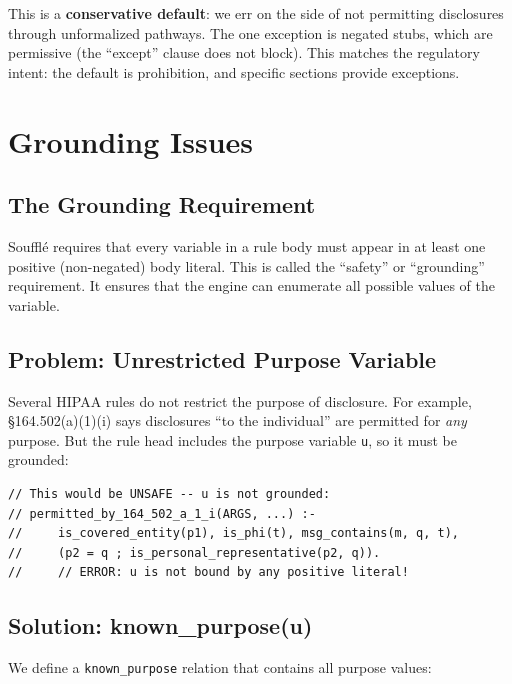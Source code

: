 \documentclass[11pt,letterpaper]{article}
\begin{document}
This is a \textbf{conservative default}: we err on the side of not permitting disclosures through unformalized pathways. The one exception is negated stubs, which are permissive (the ``except'' clause does not block). This matches the regulatory intent: the default is prohibition, and specific sections provide exceptions.


\section{Grounding Issues}
\label{sec:grounding}

\subsection{The Grounding Requirement}

Souffl\'{e} requires that every variable in a rule body must appear in at least one positive (non-negated) body literal. This is called the ``safety'' or ``grounding'' requirement. It ensures that the engine can enumerate all possible values of the variable.

\subsection{Problem: Unrestricted Purpose Variable}

Several HIPAA rules do not restrict the purpose of disclosure. For example, \S 164.502(a)(1)(i) says disclosures ``to the individual'' are permitted for \emph{any} purpose. But the rule head includes the purpose variable \texttt{u}, so it must be grounded:

\begin{lstlisting}[style=soufflestyle]
// This would be UNSAFE -- u is not grounded:
// permitted_by_164_502_a_1_i(ARGS, ...) :-
//     is_covered_entity(p1), is_phi(t), msg_contains(m, q, t),
//     (p2 = q ; is_personal_representative(p2, q)).
//     // ERROR: u is not bound by any positive literal!
\end{lstlisting}

\subsection{Solution: known\_purpose(u)}

We define a \texttt{known\_purpose} relation that contains all purpose values:
\end{document}
